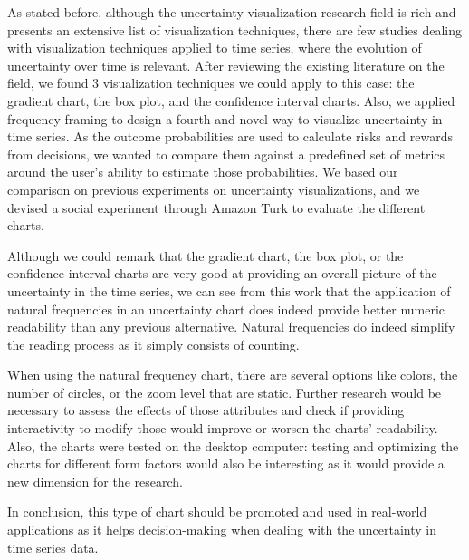 \documentclass[a4paper,3p,sort&compress]{elsarticle}
\begin{document}
As stated before, although the uncertainty visualization research field is rich
and presents an extensive list of visualization techniques, there are few
studies dealing with visualization techniques applied to time series, where the
evolution of uncertainty over time is relevant. After reviewing the existing
literature on the field, we found 3 visualization techniques we could apply to
this case: the gradient chart, the box plot, and the confidence interval charts.
Also, we applied frequency framing to design a fourth and novel way to visualize
uncertainty in time series. As the outcome probabilities are used to calculate
risks and rewards from decisions, we wanted to compare them against a predefined
set of metrics around the user's ability to estimate those probabilities. We
based our comparison on previous experiments on uncertainty visualizations, and
we devised a social experiment through Amazon Turk to evaluate the different
charts.

Although we could remark that the gradient chart, the box plot, or the
confidence interval charts are very good at providing an overall picture of the
uncertainty in the time series, we can see from this work that the application
of natural frequencies in an uncertainty chart does indeed provide better
numeric readability than any previous alternative. Natural frequencies do indeed
simplify the reading process as it simply consists of counting.

When using the natural frequency chart, there are several options like colors,
the number of circles, or the zoom level that are static. Further research would
be necessary to assess the effects of those attributes and check if providing
interactivity to modify those would improve or worsen the charts' readability.
Also, the charts were tested on the desktop computer: testing and optimizing the
charts for different form factors would also be interesting as it would provide
a new dimension for the research. 

In conclusion, this type of chart should be promoted and used in real-world
applications as it helps decision-making when dealing with the uncertainty in
time series data. 

\label{sec:ref}


\end{document}
